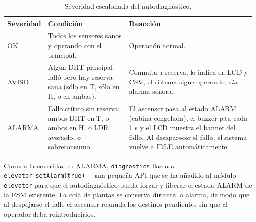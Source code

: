 \begin{table}[H]
  \centering
  \small
  \begin{tabular}{p{} p{} p{}}
    \toprule
    \textbf{Severidad} & \textbf{Condición} & \textbf{Reacción} \\
    \midrule
    \textsf{OK}     & Todos los sensores sanos y operando con el principal.
                    & Operación normal. \\
    \textsf{AVISO}  & Algún DHT principal falló pero hay reserva sana
                      (sólo en T, sólo en H, o en ambas).
                    & Conmuta a reserva, lo indica en LCD y CSV, el sistema
                      sigue operando; \emph{sin} alarma sonora. \\
    \textsf{ALARMA} & Fallo crítico sin reserva: ambos DHT en T,
                      o ambos en H, o LDR averiado, o sobreconsumo.
                    & El ascensor pasa al estado \textsf{ALARM} (cabina
                      congelada), el buzzer pita cada
                      1 s y el LCD muestra el banner del fallo.
                      Al desaparecer el fallo, el sistema vuelve a
                      \textsf{IDLE} automáticamente. \\
    \bottomrule
  \end{tabular}
  \caption{Severidad escalonada del autodiagnóstico.}
  \label{tab:severidad}
\end{table}

Cuando la severidad es \textsf{ALARMA}, \texttt{diagnostics} llama a
\texttt{elevator\_setAlarm(true)} ---una pequeña API que se ha añadido al
módulo \texttt{elevator} para que el autodiagnóstico pueda forzar y liberar
el estado \textsf{ALARM} de la FSM existente. La cola de plantas se conserva
durante la alarma, de modo que al despejarse el fallo el ascensor reanuda
los destinos pendientes sin que el operador deba reintroducirlos.
